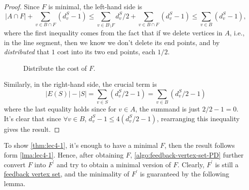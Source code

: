 \begin{proof}
	Since \(F\) is minimal, the left-hand side is
	\[
		\left\vert A \cap  F \right\vert + \sum_{v\in B \cap F}(d_{v} ^S - 1) \leq \sum_{v\in B \setminus F} d_{v} ^S / 2 + \sum_{v\in B \cap F}(d_{v} ^S - 1) \leq \sum_{v\in B}(d_{v}^S - 1 ),
	\]
	where the first inequality comes from the fact that if we delete vertices in \(A\), i.e., in the line segment, then we know we don't delete its end points, and by \emph{distributed} that \(1\) cost into its two end points, each \(1 / 2\).
	\begin{figure}[H]
		\centering
		\caption{Distribute the cost of \(F\).}
		\label{fig:FBV-line-segment}
	\end{figure}
	Similarly, in the right-hand side, the crucial term is
	\[
		\left\vert E(S) \right\vert - \left\vert S \right\vert = \sum_{v\in S}(d_{v} ^S / 2 - 1) = \sum_{v\in B} (d_{v} ^S / 2 - 1)
	\]
	where the last equality holds since for \(v\in A\), the summand is just \(2 / 2 - 1 = 0\). It's clear that since \(\forall v\in B\), \(d_v^S - 1 \leq 4 (d_{v} ^S / 2 - 1)\), rearranging this inequality gives the result.
\end{proof}

To show \autoref{thm:lec4-1}, it's enough to have a minimal \(F\), then the result follows form \autoref{lma:lec4-1}. Hence, after obtaining \(F\), \autoref{algo:feedback-vertex-set-PD} further convert \(F\) into \(F^\prime \) and  try to obtain a minimal version of \(F\). Clearly, \(F^\prime \) is still a \hyperref[prb:feedback-vertex-set]{feedback vertex set}, and the minimality of \(F^\prime \) is guaranteed by the following lemma.

